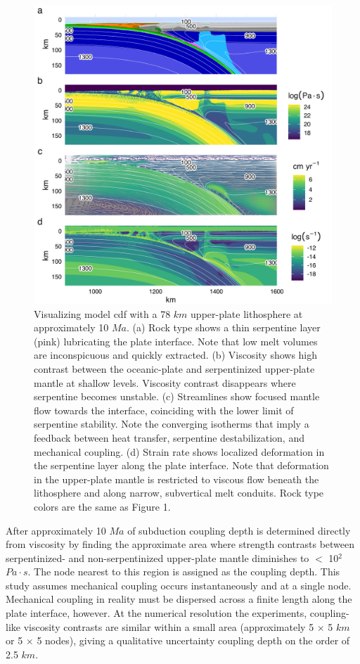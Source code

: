 \begin{figure}[htbp]

{\centering \includegraphics[width=1\linewidth,]{assets/figs/chpt2/fig3} 

}

\caption[Numerical experiment visualization]{Visualizing model cdf with a 78 $km$ upper-plate lithosphere at approximately 10 $Ma$. (a) Rock type shows a thin serpentine layer (pink) lubricating the plate interface. Note that low melt volumes are inconspicuous and quickly extracted. (b) Viscosity shows high contrast between the oceanic-plate and serpentinized upper-plate mantle at shallow levels. Viscosity contrast disappears where serpentine becomes unstable. (c) Streamlines show focused mantle flow towards the interface, coinciding with the lower limit of serpentine stability. Note the converging isotherms that imply a feedback between heat transfer, serpentine destabilization, and mechanical coupling. (d) Strain rate shows localized deformation in the serpentine layer along the plate interface. Note that deformation in the upper-plate mantle is restricted to viscous flow beneath the lithosphere and along narrow, subvertical melt conduits. Rock type colors are the same as Figure 1.}\label{fig:comp}
\end{figure}

After approximately 10 \(Ma\) of subduction coupling depth is determined directly from viscosity by finding the approximate area where strength contrasts between serpentinized- and non-serpentinized upper-plate mantle diminishes to \(<\) 10\(^2\) \(Pa \cdot s\). The node nearest to this region is assigned as the coupling depth. This study assumes mechanical coupling occurs instantaneously and at a single node. Mechanical coupling in reality must be dispersed across a finite length along the plate interface, however. At the numerical resolution the experiments, coupling-like viscosity contrasts are similar within a small area (approximately 5 \(\times\) 5 \(km\) or 5 \(\times\) 5 nodes), giving a qualitative uncertainty coupling depth on the order of 2.5 \(km\).

